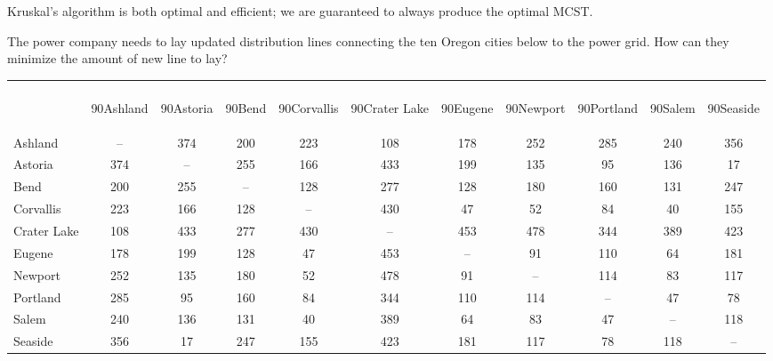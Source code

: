 Kruskal's algorithm is both optimal and efficient; we are guaranteed to always produce the optimal MCST.

\begin{example}{} %
The power company needs to lay updated distribution lines connecting the ten Oregon cities below to the power grid.  How can they minimize the amount of new line to lay?
 
\begin{center}
\begin{tabular}{|l|c|c|c|c|c|c|c|c|c|c|}
\hline
&&&&&&&&&&\\[7ex]
& \begin{rotate}{90}Ashland \end{rotate}& \begin{rotate}{90}Astoria\end{rotate}  & \begin{rotate}{90}Bend \end{rotate}& \begin{rotate}{90}Corvallis \end{rotate} & \begin{rotate}{90}Crater Lake \end{rotate} &  \begin{rotate}{90}Eugene  \end{rotate}&  \begin{rotate}{90}Newport \end{rotate} &  \begin{rotate}{90}Portland  \end{rotate}& \begin{rotate}{90}Salem \end{rotate} &  \begin{rotate}{90}Seaside \end{rotate}\\
\hline
Ashland & --&374&200&223&108&178&252&285&240&356\\
\hline
Astoria & 374&--&255&166&433&199&135&95&136&17\\
\hline
Bend & 200 & 255 &--&128&277&128&180 & 160&131&247\\
\hline
Corvallis&223&166&128&--&430&47&52&84&40&155\\
\hline
Crater Lake &108&433&277&430&--&453&478&344&389&423\\
\hline
Eugene &178&199&128&47&453&--&91&110&64&181\\
\hline
Newport&252&135&180&52&478&91&--&114&83&117\\
\hline
Portland &285&95&160&84&344&110&114&--&47&78\\
\hline
Salem & 240 &136&131&40&389&64&83&47&--&118\\
\hline
Seaside&356&17&247&155&423&181&117&78&118&--\\
\hline
\end{tabular}
\end{center}


\end{example}
